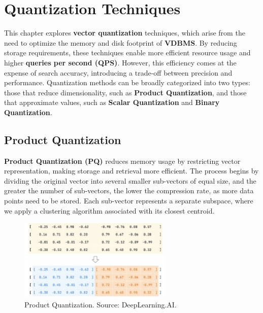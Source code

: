 \pagestyle{fancy}
\chapter{Quantization Techniques}
\label{chap:Vector quantization in VBDMS}
This chapter explores \textbf{vector quantization} techniques, which arise from the need to optimize the memory and disk footprint of \textbf{VDBMS}. By reducing storage requirements, these techniques enable more efficient resource usage and higher \textbf{queries per second (QPS)}. However, this efficiency comes at the expense of search accuracy, introducing a trade-off between precision and performance. Quantization methods can be broadly categorized into two types: those that reduce dimensionality, such as \textbf{Product Quantization}, and those that approximate values, such as \textbf{Scalar Quantization} and \textbf{Binary Quantization}.

\section{Product Quantization}
\textbf{Product Quantization (PQ)} reduces memory usage by restricting vector representation, making storage and retrieval more efficient. The process begins by dividing the original vector into several smaller sub-vectors of equal size, and the greater the number of sub-vectors, the lower the compression rate, as more data points need to be stored. Each sub-vector represents a separate subspace, where we apply a clustering algorithm associated with its closest centroid.
\begin{figure}[h]
    \centering
    \includegraphics[width=0.65\textwidth]{IMAGES/immagine_2025-02-27_122846884.png}
    \caption[Product Quantization.]{Product Quantization. Source: DeepLearning.AI.\footnotemark[1]}
    \label{fig:PQ}
\end{figure}

